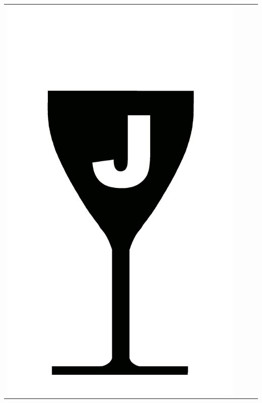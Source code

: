 {\begin{center}
\begin{tabular}{ c c c c}
\includegraphics[scale=0.021, trim= 0em -5em -5em -5em,]{Icones/icon_jura_black.pdf}
&

\end{tabular}
\end{center}}
